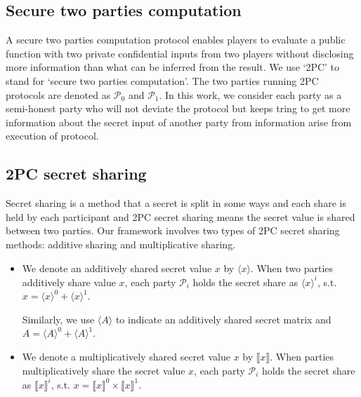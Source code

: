 \documentclass[letterpaper]{article} %
\begin{document}
    \subsection{Secure two parties computation}
    A secure two parties computation protocol enables players to evaluate a public function
    with two private confidential inputs from two players
    without disclosing more information than what can be inferred from the result.
    We use `2PC' to stand for `secure two parties computation'.
    The two parties running 2PC protocols are denoted as $\mathcal{P}_{0} $ and $\mathcal{P}_{1}$.
    In this work, we consider each party as a semi-honest party
    who will not deviate the protocol but keeps tring to get more information about
    the secret input of another party from information arise from execution of protocol.


    \subsection{2PC secret sharing}
    Secret sharing is a method that a secret is split in some ways and each share is held by each participant
    and 2PC secret sharing means the secret value is shared between two parties.
    Our framework involves two types of 2PC secret sharing methods:
    additive sharing and multiplicative sharing.

    \begin{itemize}
        \item
        We denote an additively shared secret value $x$ by $\langle x\rangle $.
        When two parties additively share value $x$,
        each party $\mathcal{P}_{i}$ holds the secret share as $\langle x\rangle ^{i}$, s.t.
        $x=\langle x\rangle ^{0}+\langle x\rangle ^{1}$.

        Similarly, we use $\langle A\rangle $ to indicate an additively shared secret matrix
        and $A =\langle A\rangle ^{0}+\langle A\rangle ^{1}$.

        \item We denote a multiplicatively shared secret value $x$ by $\llbracket x \rrbracket$.
        When parties multiplicatively share the secret value $x$,
        each party $\mathcal{P}_{i}$ holds the secret share as $\llbracket x \rrbracket ^{i}$, s.t.
        $x=\llbracket x \rrbracket ^{0}\times \llbracket x \rrbracket ^{1}$.

    \end{itemize}
\end{document}
